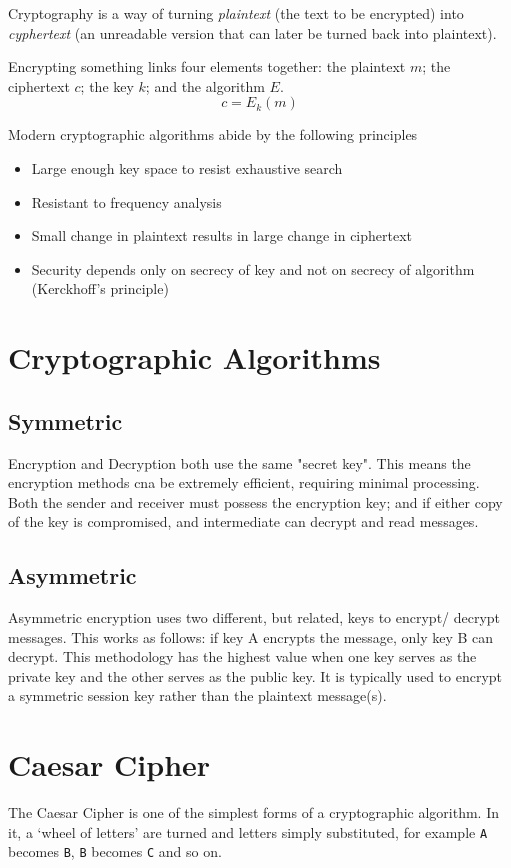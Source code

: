 
Cryptography is a way of turning \textit{plaintext} (the text to be encrypted) into \textit{cyphertext} (an unreadable version that can later be turned back into plaintext).

Encrypting something links four elements together: the plaintext $m$; the ciphertext $c$; the key $k$; and the algorithm $E$.
\[c=E_k(m)\]

Modern cryptographic algorithms abide by the following principles
\begin{itemize}
    \item Large enough key space to resist exhaustive search
    \item Resistant to frequency analysis
    \item Small change in plaintext results in large change in ciphertext
    \item Security depends only on secrecy of key and not on secrecy of algorithm (Kerckhoff's principle)
\end{itemize}

\section*{Cryptographic Algorithms}
\subsection*{Symmetric}
Encryption and Decryption both use the same "secret key". This means the encryption methods cna be extremely efficient, requiring minimal processing. Both the sender and receiver must possess the encryption key; and if either copy of the key is compromised, and intermediate can decrypt and read messages.

\subsection*{Asymmetric}
Asymmetric encryption uses two different, but related, keys to encrypt/ decrypt messages. This works as follows: if key A encrypts the message, only key B can decrypt. This methodology has the highest value when one key serves as the private key and the other serves as the public key. It is typically used to encrypt a symmetric session key rather than the plaintext message(s). 

\section*{Caesar Cipher}
The Caesar Cipher is one of the simplest forms of a cryptographic algorithm. In it, a `wheel of letters' are turned and letters simply substituted, for example \verb|A| becomes \verb|B|, \verb|B| becomes \verb|C| and so on.

